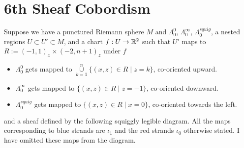 \section{6th Sheaf Cobordism}
Suppose we have a punctured Riemann sphere $M$ and $\Lambda_0^0$, $\Lambda_0^\infty$, $\Lambda_0^{squig}$, a nested regions $U\subset U' \subset M$, and a chart $f : U \rightarrow \mathbb{R}^2$ such that $U'$ maps to $R:=(-1,1)_x \times (-2,n+1)_z$ under $f$
\begin{itemize}
\item $\Lambda_0^0$ gets mapped to $\overset{n}{\underset{k=1}{\cup}}\{(x,z)\in R \mid z=k\}$, co-oriented upward.

\item $\Lambda_0^\infty$ gets mapped to $\{(x,z)\in R \mid z=-1\}$, co-oriented downward.

\item $\Lambda_0^{squig}$ gets mapped to $\{(x,z)\in R \mid x=0\}$, co-oriented towards the left.
\end{itemize}
and a sheaf defined by the following squiggly legible diagram. All the maps corresponding to blue strands are $\iota_1$ and the red strands $\iota_0$ otherwise stated. I have omitted these maps from the diagram.\\

